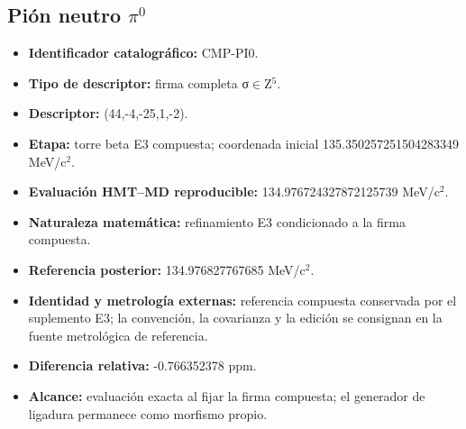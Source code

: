 \subsection{Pión neutro \texorpdfstring{\(\pi^{0}\)}{pi0}}
\begin{itemize}
\item \textbf{Identificador catalográfico:} CMP-PI0.
\item \textbf{Tipo de descriptor:} firma completa σ\(\in\)Z\({}^{5}\).
\item \textbf{Descriptor:} (44,-4,-25,1,-2).
\item \textbf{Etapa:} torre beta E3 compuesta; coordenada inicial 135.350257\allowbreak{}251504\allowbreak{}283349 MeV/c\({}^{2}\).
\item \textbf{Evaluación HMT--MD reproducible:} 134.976724\allowbreak{}327872\allowbreak{}125739 MeV/c\({}^{2}\).
\item \textbf{Naturaleza matemática:} refinamiento E3 condicionado a la firma compuesta.
\item \textbf{Referencia posterior:} 134.976827\allowbreak{}767685 MeV/c\({}^{2}\).
\item \textbf{Identidad y metrología externas:} referencia compuesta conservada por el suplemento E3; la convención, la covarianza y la edición se consignan en la fuente metrológica de referencia.
\item \textbf{Diferencia relativa:} -0.766352\allowbreak{}378 ppm.
\item \textbf{Alcance:} evaluación exacta al fijar la firma compuesta; el generador de ligadura permanece como morfismo propio.
\end{itemize}
